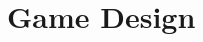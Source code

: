 \documentclass[../Main.tex]{subfiles}
\begin{document}
\section{Game Design}

\biblio %
\end{document}
